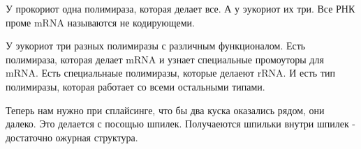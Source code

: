 У прокориот одна полимираза, которая делает все. А у эукориот их три. Все РНК проме mRNA
называются не кодирующеми. 

У эукориот три разных полимиразы с различным 
функционалом. Есть полимираза, которая делает mRNA и узнает 
специальные промоуторы для mRNA. Есть специальнаые полимиразы, 
которые делаеют rRNA. И есть тип полимиразы, которая работает со всеми остальными типами. 


Теперь нам нужно при сплайсинге, что бы два куска оказались рядом, они далеко. Это 
делается с посощью шпилек. Получаеются шпильки внутри шпилек - достаточно ожурная структура. 

 



